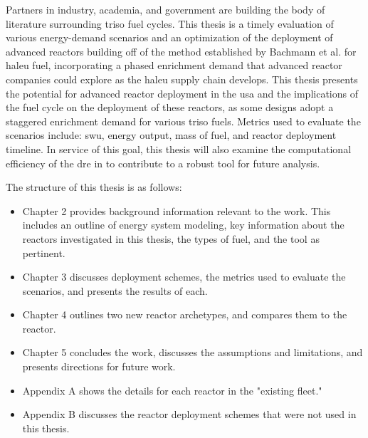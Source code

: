 Partners in industry, academia, and government are building the body of
literature surrounding \gls{triso} fuel cycles. This thesis is a timely
evaluation of various energy-demand scenarios and an optimization of the
deployment of advanced reactors building off of the method established by
Bachmann et al. \cite{bachmann_enrichment_2021} for \gls{haleu} fuel,
incorporating a phased enrichment demand that advanced reactor companies could
explore as the \gls{haleu} supply chain develops. This thesis presents the
potential for advanced reactor deployment in the \gls{usa} and the implications
of the fuel cycle on the deployment of these reactors, as some designs adopt a
staggered enrichment demand for various \gls{triso} fuels. Metrics used to
evaluate the scenarios include: \gls{swu}, energy output, mass of fuel, and
reactor deployment timeline. In service of this goal, this thesis will also
examine the computational efficiency of the \gls{dre} in \cyclus to contribute
to a robust tool for future analysis.


The structure of this thesis is as follows:

\begin{itemize}
    \item Chapter 2 provides background information relevant to the work. This includes an outline of energy system modeling, key information about the reactors investigated in this thesis, the types of fuel, and the \cyclus tool as pertinent.
    \item Chapter 3 discusses deployment schemes, the metrics used to evaluate the scenarios, and presents the results of each.
    \item Chapter 4 outlines two new reactor archetypes, and compares them to the \cycamore reactor.
    \item Chapter 5 concludes the work, discusses the assumptions and limitations, and presents directions for future work.
    \item Appendix A shows the details for each reactor in the "existing fleet."
    \item Appendix B discusses the reactor deployment schemes that were not used in this thesis.
\end{itemize}